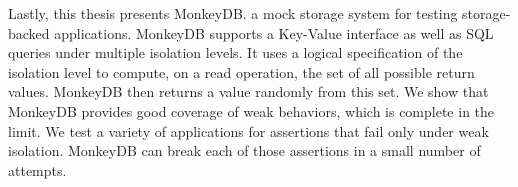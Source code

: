 Lastly, this thesis presents MonkeyDB. a mock storage system for testing storage-backed
applications. MonkeyDB supports a Key-Value interface as well as SQL queries
under multiple isolation levels. It uses a logical specification of the isolation
level to compute, on a read operation, the set of all possible return values.
MonkeyDB then returns a value randomly from this set. 
We show that MonkeyDB provides 
good coverage of weak behaviors, which is complete in the limit. We test a
variety of applications for assertions that fail only under weak isolation.
MonkeyDB can break each of those assertions in a small number of attempts. 